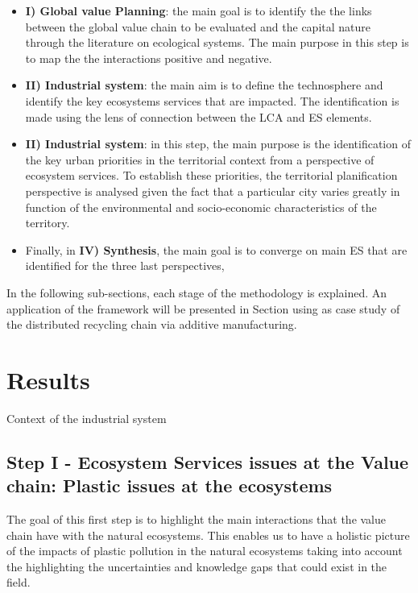 \documentclass[]{elsarticle} %
\begin{document}
\begin{itemize}
\item
  \textbf{I) Global value Planning}: the main goal is to identify the the links between the global value chain to be evaluated and the capital nature through the literature on ecological systems.
  The main purpose in this step is to map the the interactions positive and negative.
\item
  \textbf{II) Industrial system}: the main aim is to define the technosphere and identify the key ecosystems services that are impacted.
  The identification is made using the lens of connection between the LCA and ES elements.
\item
  \textbf{II) Industrial system}: in this step, the main purpose is the identification of the key urban priorities in the territorial context from a perspective of ecosystem services.
  To establish these priorities, the territorial planification perspective is analysed given the fact that a particular city varies greatly in function of the environmental and socio-economic characteristics of the territory.
\item
  Finally, in \textbf{IV) Synthesis}, the main goal is to converge on main ES that are identified for the three last perspectives,
\end{itemize}

In the following sub-sections, each stage of the methodology is explained.
An application of the framework will be presented in Section \label{results} using as case study of the distributed recycling chain via additive manufacturing.

\hypertarget{results}{%
\section{Results}\label{results}}

\label{results}

Context of the industrial system

\hypertarget{step-i---ecosystem-services-issues-at-the-value-chain-plastic-issues-at-the-ecosystems}{%
\subsection{Step I - Ecosystem Services issues at the Value chain: Plastic issues at the ecosystems}\label{step-i---ecosystem-services-issues-at-the-value-chain-plastic-issues-at-the-ecosystems}}

The goal of this first step is to highlight the main interactions that the value chain have with the natural ecosystems.
This enables us to have a holistic picture of the impacts of plastic pollution in the natural ecosystems taking into account the highlighting the uncertainties and knowledge gaps that could exist in the field.
\end{document}
